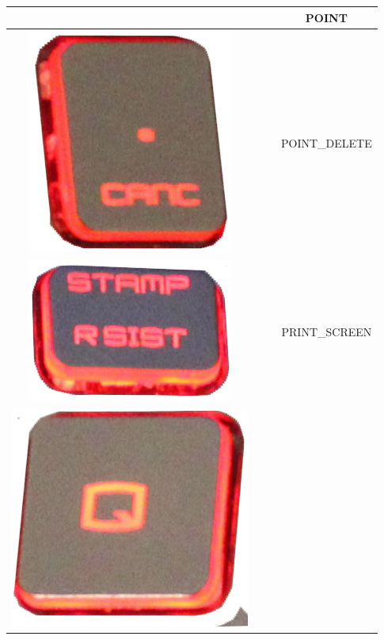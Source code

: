 \begin{longtable}{cccc}
\begin{minipage}[c]{.3\textwidth}
\vspace{0.2cm}
\end{minipage} & & & POINT\\
\hline
\begin{minipage}[c]{.3\textwidth}
\vspace{0.2cm}
\includegraphics[scale=0.1]{Images/KeyMapping/POINT_DELETE}
\vspace{0.2cm}
\end{minipage} & & & POINT\_DELETE\\
\hline
\begin{minipage}[c]{.3\textwidth}
\vspace{0.2cm}
\includegraphics[scale=0.1]{Images/KeyMapping/PRINT_SCREEN}
\vspace{0.2cm}
\end{minipage} & & & PRINT\_SCREEN\\
\hline
\begin{minipage}[c]{.3\textwidth}
\vspace{0.2cm}
\includegraphics[scale=0.1]{Images/KeyMapping/q}

\end{minipage}
\end{longtable}
